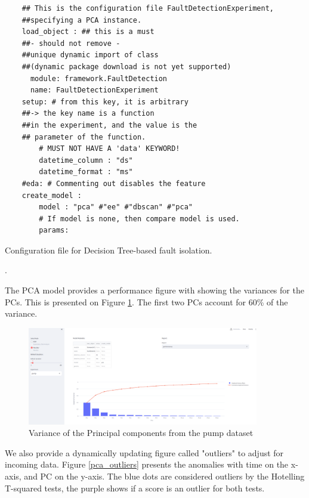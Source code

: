 \documentclass[preprint,12pt, a4paper]{elsarticle}
\begin{document}
\begin{listing}[ht]
\begin{verbatim}
    ## This is the configuration file FaultDetectionExperiment, 
    ##specifying a PCA instance.
    load_object : ## this is a must
    ##- should not remove - 
    ##unique dynamic import of class 
    ##(dynamic package download is not yet supported)
      module: framework.FaultDetection  
      name: FaultDetectionExperiment
    setup: # from this key, it is arbitrary 
    ##-> the key name is a function 
    ##in the experiment, and the value is the 
    ## parameter of the function.
        # MUST NOT HAVE A 'data' KEYWORD!
        datetime_column : "ds"
        datetime_format : "ms"
    #eda: # Commenting out disables the feature
    create_model :
        model : "pca" #"ee" #"dbscan" #"pca" 
        # If model is none, then compare model is used.
        params:
\end{verbatim}
\caption{Configuration file for Decision Tree-based fault isolation.}
\label{lst:pca}.
\end{listing}


The PCA model provides a performance figure with showing the variances for the PCs. This is presented on Figure \ref{variance}. The first two PCs account for 60\% of the variance.

\begin{figure}[h!]%
\includegraphics[width=0.9\textwidth, clip, trim={0 0 0 0}]{figs/variancia.png}
{\caption{Variance of the Principal components from the pump dataset}
\label{variance}}
\end{figure}

We also provide a dynamically updating figure called "outliers" to adjust for incoming data. Figure \ref{pca_outliers} presents the anomalies with time on the x-axis, and PC on the y-axis. The blue dots are considered outliers by the Hotelling T-squared tests, the purple shows if a score is an outlier for both tests.
\end{document}
